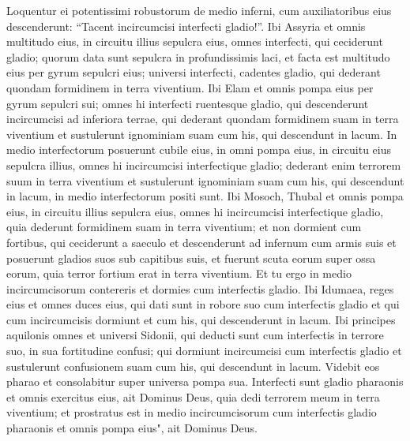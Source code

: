 \begin{biblechapter}
\verse Loquentur ei potentissimi robustorum de medio inferni, cum auxiliatoribus eius descenderunt: “Tacent incircumcisi interfecti gladio!”. 
\verse Ibi Assyria et omnis multitudo eius, in circuitu illius sepulcra eius, omnes interfecti, qui ceciderunt gladio; 
\verse quorum data sunt sepulcra in profundissimis laci, et facta est multitudo eius per gyrum sepulcri eius; universi interfecti, cadentes gladio, qui dederant quondam formidinem in terra viventium. 
\verse Ibi Elam et omnis pompa eius per gyrum sepulcri sui; omnes hi interfecti ruentesque gladio, qui descenderunt incircumcisi ad inferiora terrae, qui dederant quondam formidinem suam in terra viventium et sustulerunt ignominiam suam cum his, qui descendunt in lacum. 
\verse In medio interfectorum posuerunt cubile eius, in omni pompa eius, in circuitu eius sepulcra illius, omnes hi incircumcisi interfectique gladio; dederant enim terrorem suum in terra viventium et sustulerunt ignominiam suam cum his, qui descendunt in lacum, in medio interfectorum positi sunt. 
\verse Ibi Mosoch, Thubal et omnis pompa eius, in circuitu illius sepulcra eius, omnes hi incircumcisi interfectique gladio, quia dederunt formidinem suam in terra viventium; 
\verse et non dormient cum fortibus, qui ceciderunt a saeculo et descenderunt ad infernum cum armis suis et posuerunt gladios suos sub capitibus suis, et fuerunt scuta eorum super ossa eorum, quia terror fortium erat in terra viventium. 
\verse Et tu ergo in medio incircumcisorum contereris et dormies cum interfectis gladio. 
\verse Ibi Idumaea, reges eius et omnes duces eius, qui dati sunt in robore suo cum interfectis gladio et qui cum incircumcisis dormiunt et cum his, qui descenderunt in lacum. 
\verse Ibi principes aquilonis omnes et universi Sidonii, qui deducti sunt cum interfectis in terrore suo, in sua fortitudine confusi; qui dormiunt incircumcisi cum interfectis gladio et sustulerunt confusionem suam cum his, qui descendunt in lacum. 
\verse Videbit eos pharao et consolabitur super universa pompa sua. Interfecti sunt gladio pharaonis et omnis exercitus eius, ait Dominus Deus, 
\verse quia dedi terrorem meum in terra viventium; et prostratus est in medio incircumcisorum cum interfectis gladio pharaonis et omnis pompa eius", ait Dominus Deus. 
\end{biblechapter}

